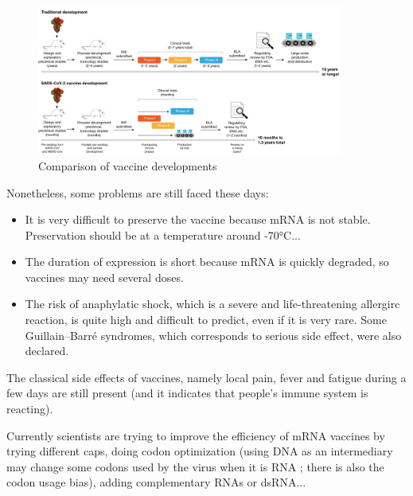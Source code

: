 \documentclass{article}
\begin{document}
            \begin{figure}
                \centering
                \includegraphics[width=0.9\textwidth]{imgs/CovidDev.png}
                \caption{Comparison of vaccine developments \autocite{krammerSARSCoV2VaccinesDevelopment2020}}
                \label{fig:devVaccine}
            \end{figure}

            Nonetheless, some problems are still faced these days:
            \begin{itemize}
                \item It is very difficult to preserve the vaccine because mRNA is not stable. 
                    Preservation should be at a temperature around -70°C...
                \item The duration of expression is short because mRNA is quickly degraded, 
                    so vaccines may need several doses.
                \item The risk of anaphylatic shock, which is a severe and life-threatening allergirc reaction, is quite high and difficult to predict, even if it is very rare.
                        Some Guillain–Barré syndromes, which corresponds to serious side effect, were also declared.
            \end{itemize}
            The classical side effects of vaccines, namely local pain, fever and fatigue during a few days are still present
                 (and it indicates that people's immune system is reacting).
            
            Currently scientists are trying to improve the efficiency of mRNA vaccines by trying different caps,
            doing codon optimization (using DNA as an intermediary may change some codons used by the virus when it is RNA ; there is also the codon usage bias),
            adding complementary RNAs or dsRNA... \autocite{MRNATransformativeTechnology}

\end{document}
